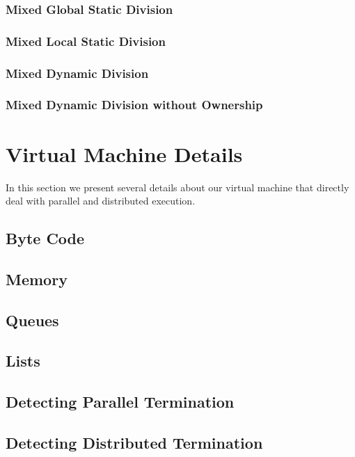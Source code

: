 \documentclass[preprint]{sigplanconf}
\begin{document}
\subsubsection{Mixed Global Static Division}
\subsubsection{Mixed Local Static Division}
\subsubsection{Mixed Dynamic Division}
\subsubsection{Mixed Dynamic Division without Ownership}

\section{Virtual Machine Details} 

In this section we present several details about our virtual machine
that directly deal with parallel and distributed execution.

\subsection{Byte Code}

\subsection{Memory}

\subsection{Queues}

\subsection{Lists}

\subsection{Detecting Parallel Termination}

\subsection{Detecting Distributed Termination}
\end{document}
